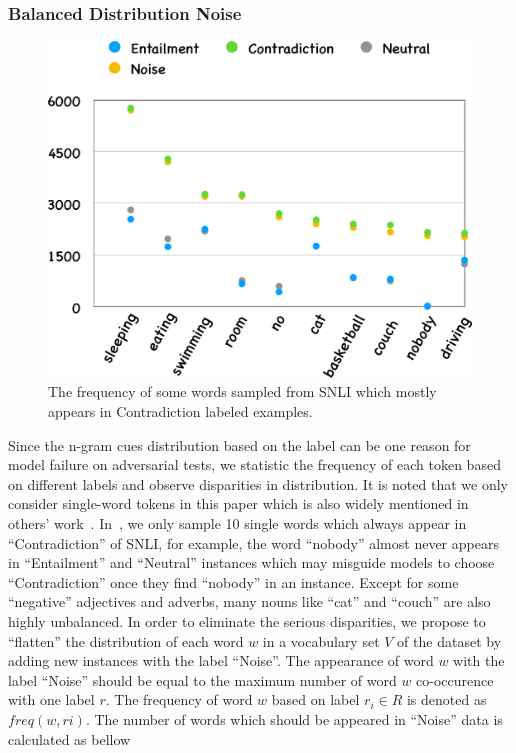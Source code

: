 \subsubsection{Balanced Distribution Noise}

\begin{figure}[th!]
	\centering
	\includegraphics[width=0.6\columnwidth]{figures/noise_balance.eps}
	\caption{The frequency of some words sampled from SNLI which mostly appears in Contradiction labeled examples.
	}
\label{fig:noise_balance}
\end{figure}

Since the n-gram cues distribution based on the label can be one reason for 
model failure on adversarial tests, we statistic the frequency of 
each token based on different labels and observe disparities in distribution. 
It is noted that we only consider single-word tokens in this paper which is also widely mentioned 
in others' work~\cite{niven2019probing,naik2018stress}. 
In~, we only sample 10 single words 
which always appear in ``Contradiction'' of SNLI, 
for example, the word ``nobody'' almost never appears 
in ``Entailment'' and ``Neutral'' instances which may misguide models to choose 
``Contradiction'' once they find ``nobody'' in an instance. Except for 
some ``negative'' adjectives and adverbs, many nouns like ``cat'' and ``couch'' 
are also highly unbalanced. In order to eliminate the serious disparities, 
we propose to ``flatten'' the distribution of each word $w$ in a vocabulary 
set $V$ of the dataset by adding 
new instances with the label ``Noise''. The appearance of word $w$ with the label ``Noise'' 
should be equal to the maximum number of word $w$ co-occurence with one label $r$. 
The frequency of word $w$ based on label $r_{i}\in{R}$ is denoted as $freq(w, r{i})$. 
The number of words which should be appeared in ``Noise'' data is calculated as bellow

